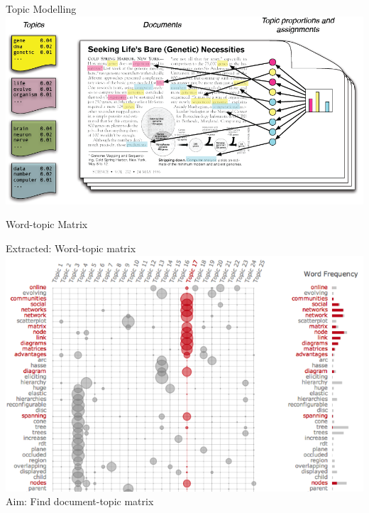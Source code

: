 \documentclass{lecture}
\begin{document}
\begin{plain}{Topic Modelling}
\includegraphics[scale=0.35]{figs/blei}
\end{plain}

\begin{plain}{Word-topic Matrix}
\begin{center}
\vspace{-2ex}
Extracted: Word-topic matrix
\includegraphics[scale=0.36]{figs/word_topic}\\
Aim: Find document-topic matrix
\end{center}
\end{plain}
\end{document}
